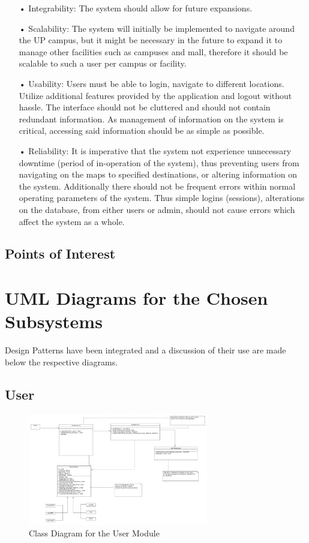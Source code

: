 \documentclass[runningheads,a4paper]{article}
\begin{document}
\begin{enumerate}
\item[•]Integrability: The system should allow for future expansions.
\item[•]Scalability: The system will initially be implemented to navigate around the UP campus, but it might be necessary in the future to expand it to manage other facilities such as campuses and mall, therefore it should be scalable to such a user per campus or facility.
\item[•]Usability: Users must be able to login, navigate to different locations. Utilize additional features provided by the application and logout without hassle. The interface should not be cluttered and should not contain redundant information. As management of information on the system is critical, accessing said information should be as simple as possible.
\item[•]Reliability: It is imperative that the system not experience unnecessary downtime (period of in-operation of the system), thus preventing users from navigating on the maps to specified destinations, or altering information on the system. Additionally there should not be frequent errors within normal operating parameters of the system. Thus simple logins (sessions), alterations on the database, from either users or admin, should not cause errors which affect the system as a whole.

\end{enumerate}
\subsection{Points of Interest}


\section{UML Diagrams for the Chosen Subsystems}

Design Patterns have been integrated and a discussion of their use are made below the respective diagrams.

\subsection {User}

\begin{figure}[H]
   	\centering
   	\includegraphics[width=0.7\textwidth]{User_Class_Diagrams.png}
   	\caption{Class Diagram for the User Module}
\end{figure}
\end{document}
